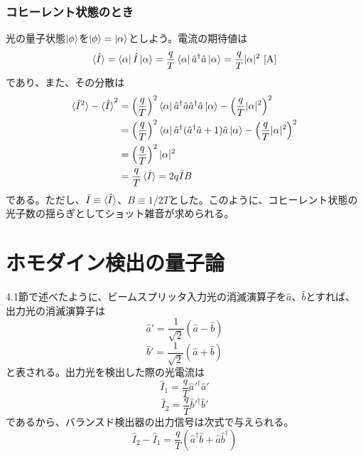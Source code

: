 \subsubsection{コヒーレント状態のとき}
光の量子状態$\ket \phi$を$\ket \phi = \ket \alpha$としよう。電流の期待値は
\begin{equation}
	\braket{\hat I} = \bra \alpha \hat I \ket \alpha = \frac{q}{T}\bra \alpha \hat a^\dagger \hat a \ket \alpha = \frac{q}{T}|\alpha|^2 \ \mathrm{[A]}
\end{equation}
であり、また、その分散は
\begin{equation}
\begin{aligned}
  \braket{\hat I^2} - \braket {\hat I}^2 &= \left(\frac{q}{T}\right)^2 \bra \alpha \hat a^\dagger \hat a \hat a^\dagger \hat a \ket \alpha - \left(\frac{q}{T}|\alpha|^2\right)^2\\
  &= \left(\frac{q}{T}\right)^2 \bra \alpha \hat a^\dagger (\hat a^\dagger \hat a + 1) \hat a \ket \alpha - \left(\frac{q}{T}|\alpha|^2\right)^2\\
    &= \left(\frac{q}{T}\right)^2 |\alpha|^2\\
    &= \frac{q}{T}\braket{\hat I} = 2q \bar I B\\
\end{aligned}
\end{equation}
である。ただし、$\bar I \equiv \braket {\hat I}$、$B \equiv 1/2T$とした。このように、コヒーレント状態の光子数の揺らぎとしてショット雑音が求められる。

\section{ホモダイン検出の量子論}
4.1節で述べたように、ビームスプリッタ入力光の消滅演算子を$\hat a$、$\hat b$とすれば、出力光の消滅演算子は
\begin{equation}
  \hat a' = \frac{1}{\sqrt 2}(\hat a - \hat b)
\end{equation}
\begin{equation}
  \hat b' = \frac{1}{\sqrt 2}(\hat a + \hat b)
\end{equation}
と表される。出力光を検出した際の光電流は
\begin{equation}
  \hat I_1 = \frac{q}{T}\hat a'^\dagger \hat a'
\end{equation}
\begin{equation}
  \hat I_2 = \frac{q}{T}\hat b'^\dagger \hat b'
\end{equation}
であるから、バランスド検出器の出力信号は次式で与えられる。
\begin{equation}
  \hat I_2 - \hat I_1 = \frac{q}{T}(\hat a^\dagger \hat b + \hat a \hat b^\dagger)
\end{equation}

